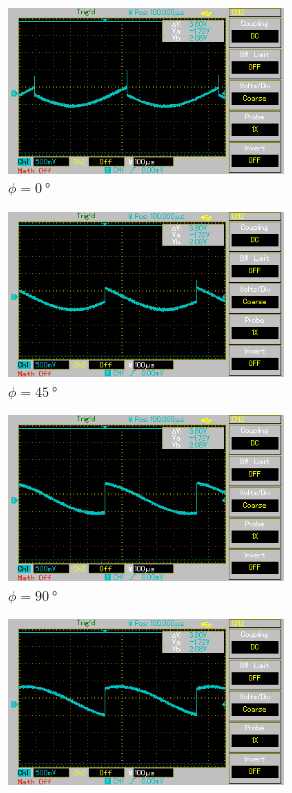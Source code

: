 \begin{figure}[H]%
    \begin{subfigure}{0.5\textwidth}%
    \centering%
    \includegraphics[width = 7.3cm]{./Oszilloskop Bilder/png/5.3/n1.png}%
    \caption{$\phi = \qty[]{0}{\degree}$}%
    \label{fig:phase6}%
    \end{subfigure}%
    \hfill%
    \begin{subfigure}{0.5\textwidth}%
    \centering%
    \includegraphics[width = 7.3cm]{./Oszilloskop Bilder/png/5.3/n2.png}%
    \caption{$\phi = \qty[]{45}{\degree}$}%
    \label{fig:phase7}%
    \end{subfigure}%
    \hfill
    \begin{subfigure}{0.5\textwidth}%
    \centering%
    \includegraphics[width = 7.3cm]{./Oszilloskop Bilder/png/5.3/n3.png}%
    \caption{$\phi = \qty[]{90}{\degree}$}%
    \label{fig:phase8}%
    \end{subfigure}%
    \hfill%
    \begin{subfigure}{0.5\textwidth}%
    \centering%
    \includegraphics[width = 7.3cm]{./Oszilloskop Bilder/png/5.3/n4.png}%

\end{subfigure}
\end{figure}
